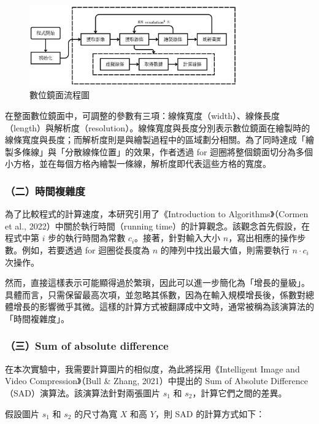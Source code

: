 \documentclass[12pt]{article}
\begin{document}
\begin{figure}[htbp]
  \centering
  \includegraphics[width=0.8\textwidth]{img//program_flaw.jpg}
  \caption{數位鏡面流程圖}\label{fig:program_flaw}
\end{figure}

在整面數位鏡面中，可調整的參數有三項：線條寬度（width）、線條長度（length）與解析度（resolution）。線條寬度與長度分別表示數位鏡面在繪製時的線條寬度與長度；而解析度則是與繪製過程中的區域劃分相關。為了同時達成「繪製多條線」與「分散線條位置」的效果，作者透過 for 迴圈將整個鏡面切分為多個小方格，並在每個方格內繪製一條線，解析度即代表這些方格的寬度。

\subsubsection{（二）時間複雜度}

為了比較程式的計算速度，本研究引用了《Introduction to Algorithms》（Cormen et al., 2022）中關於執行時間（running time）的計算觀念。該觀念首先假設，在程式中第 $i$ 步的執行時間為常數 $c_i$。接著，針對輸入大小 $n$，寫出相應的操作步數。例如，若要透過 for 迴圈從長度為 $n$ 的陣列中找出最大值，則需要執行 $n \cdot c_i$ 次操作。

然而，直接這樣表示可能顯得過於繁瑣，因此可以進一步簡化為「增長的量級」。具體而言，只需保留最高次項，並忽略其係數，因為在輸入規模增長後，係數對總體增長的影響微乎其微。這樣的計算方式被翻譯成中文時，通常被稱為該演算法的「時間複雜度」。

\subsubsection{（三）Sum of absolute difference}

在本次實驗中，我需要計算圖片的相似度，為此將採用《Intelligent Image and Video Compression》（Bull \& Zhang, 2021）中提出的 Sum of Absolute Difference（SAD）演算法。該演算法針對兩張圖片 $s_1$ 和 $s_2$，計算它們之間的差異。

假設圖片 $s_1$ 和 $s_2$ 的尺寸為寬 $X$ 和高 $Y$，則 SAD 的計算方式如下：
\end{document}
